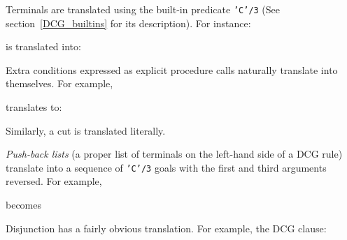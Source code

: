 Terminals are translated using the built-in predicate {\tt 'C'/3} (See 
section~\ref{DCG_builtins} for its description).  For instance:


\noindent
is translated into:


Extra conditions expressed as explicit procedure calls naturally translate
into themselves. For example,


\noindent
translates to:


Similarly, a cut is translated literally.

{\em Push-back lists} (a proper list of terminals on the left-hand side of 
a DCG rule) translate into a sequence of {\tt 'C'/3} goals with the first 
and third arguments reversed.
For example,


\noindent
becomes


Disjunction has a fairly obvious translation.  For example, the DCG clause:

